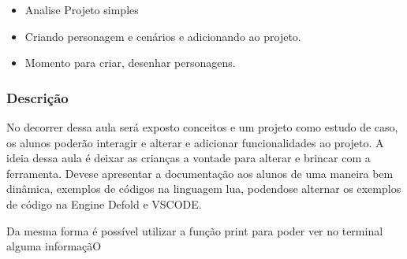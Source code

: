 \documentclass[letterpaper,10pt,brazil]{sphinxmanual}
\begin{document}
\sphinxAtStartPar
{}
\begin{itemize}
\item {} 
\sphinxAtStartPar
Analise Projeto simples

\end{itemize}

\sphinxAtStartPar
{}
\begin{itemize}
\item {} 
\sphinxAtStartPar
Criando personagem e cenários e adicionando ao projeto.

\item {} 
\sphinxAtStartPar
Momento para criar, desenhar personagens.

\end{itemize}
\subsubsection*{Descrição}

\sphinxAtStartPar
No decorrer dessa aula será exposto conceitos e um projeto como estudo de caso, os alunos poderão interagir
e alterar e adicionar funcionalidades ao projeto. A ideia dessa aula é deixar as crianças a vontade para
alterar e brincar com a ferramenta. Deve\sphinxhyphen{}se apresentar a documentação aos alunos de uma maneira bem dinâmica,
exemplos de códigos na linguagem lua, podendo\sphinxhyphen{}se alternar os exemplos de código na Engine Defold e VSCODE.
\def\sphinxLiteralBlockLabel{\label{\detokenize{modelo_aula_02:id1}}}
\begin{sphinxVerbatim}[commandchars=\\\{\}]
\end{sphinxVerbatim}

\sphinxAtStartPar
Da mesma forma é possível utilizar a função print para poder ver no terminal alguma informaçãO
\def\sphinxLiteralBlockLabel{\label{\detokenize{modelo_aula_02:id2}}}
\begin{sphinxVerbatim}[commandchars=\\\{\}]
\end{sphinxVerbatim}
\end{document}
